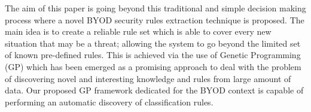 \documentclass[a4paper,10pt,twocolumn,preprint,3p]{elsarticle}
\begin{document}
The aim of this paper is going beyond this traditional and simple
decision making process where a novel  BYOD security rules extraction
technique is proposed. %
The main idea is to create a reliable rule set
which is able to cover every new situation that may be a threat;
allowing the system to go beyond the limited set of known pre-defined
rules. %
 This is achieved via the use of Genetic Programming (GP) which
has been emerged as a promising approach to deal with the problem of
discovering novel and interesting knowledge and rules from large
amount of data. Our proposed GP framework dedicated
for the BYOD context is capable of performing an automatic discovery
of classification rules.

\end{document}
